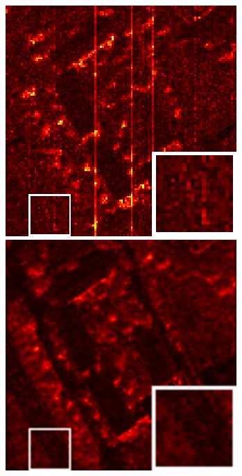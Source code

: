 \begin{figure}[t]
\begin{center}
\begin{minipage}{0.15\hsize}
		\end{minipage}
		\begin{minipage}{0.15\hsize}
			\centerline{\includegraphics[width=\hsize]{./fig_supplement/SAM_map_color_woboundary/PaviaU120/sam_map_TPTV.eps}} %
		\end{minipage}
		\begin{minipage}{0.15\hsize}
			\centerline{\includegraphics[width=\hsize]{./fig_supplement/SAM_map_color_woboundary/PaviaU120/sam_map_QRNN3D.eps}} %

\end{minipage}
\end{center}
\end{figure}
